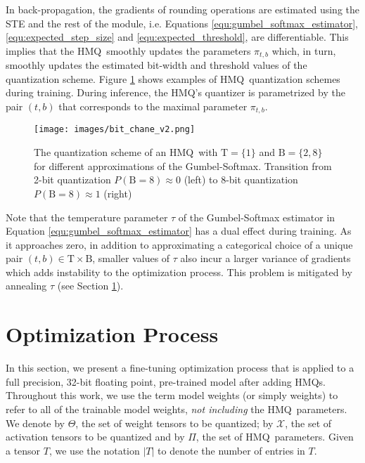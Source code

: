 \documentclass{article}
\newcommand{\bitset}{\mathrm{B}}
\newcommand{\threshset}{\mathrm{T}}
\newcommand{\qb}{HMQ}
\begin{document}
In back-propagation, the gradients of rounding operations are estimated using the STE and the rest of the module, i.e. Equations \ref{equ:gumbel_softmax_estimator}, \ref{equ:expected_step_size} and \ref{equ:expected_threshold}, are differentiable.
This implies that the \qb\ smoothly updates the parameters $\pi_{t, b}$ which, in turn, smoothly updates the estimated bit-width and threshold values of the quantization scheme.
Figure \ref{fig:transition} shows examples of \qb\ quantization schemes during training.
During inference, the \qb's quantizer is parametrized by the pair $(t, b)$ that corresponds to the maximal parameter $\pi_{t, b}$.
\begin{figure}
	\centering
	\texttt{[image: images/bit\_chane\_v2.png]}
	\caption{
		The quantization scheme of an \qb\ with $\threshset=\{1\}$ and $\bitset=\{2, 8\}$ for different approximations of the Gumbel-Softmax. 
		Transition from 2-bit quantization $P(\bitset=8)\approx 0$ (left) to 8-bit quantization $P(\bitset=8)\approx 1$ (right)
	}
	\label{fig:transition}
\end{figure}

Note that the temperature parameter $\tau$ of the Gumbel-Softmax estimator in Equation \ref{equ:gumbel_softmax_estimator} has a dual effect during training. 
As it approaches zero, in addition to approximating a categorical choice of a unique pair $(t, b)\in\threshset\times\bitset$, smaller values of $\tau$ also incur a larger variance of gradients which adds instability to the optimization process.
This problem is mitigated by annealing $\tau$ (see Section \ref{sec:method}).
 \section{Optimization Process}\label{sec:method}
In this section, we present a fine-tuning optimization process that is applied to a full precision, \mbox{32-bit} floating point, pre-trained model after adding \qb s.
Throughout this work, we use the term model weights (or simply weights) to refer to all of the trainable model weights, \textit{not including} the \qb\ parameters.
We denote by $\Theta$, the set of weight tensors to be quantized; by $\mathcal{X}$, the set of activation tensors to be quantized and by $\Pi$, the set of \qb\ parameters.
Given a tensor $T$, we use the notation $|T|$ to denote the number of entries in $T$.\\
\end{document}
